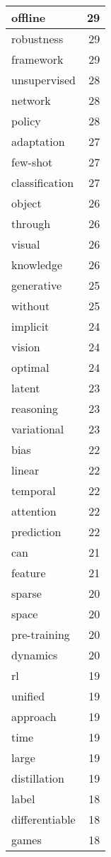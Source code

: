 \begin{table}[h]
\begin{tabular}{|l|r|}
\hline
offline & 29 \\
\hline
robustness & 29 \\
\hline
framework & 29 \\
\hline
unsupervised & 28 \\
\hline
network & 28 \\
\hline
policy & 28 \\
\hline
adaptation & 27 \\
\hline
few-shot & 27 \\
\hline
classification & 27 \\
\hline
object & 26 \\
\hline
through & 26 \\
\hline
visual & 26 \\
\hline
knowledge & 26 \\
\hline
generative & 25 \\
\hline
without & 25 \\
\hline
implicit & 24 \\
\hline
vision & 24 \\
\hline
optimal & 24 \\
\hline
latent & 23 \\
\hline
reasoning & 23 \\
\hline
variational & 23 \\
\hline
bias & 22 \\
\hline
linear & 22 \\
\hline
temporal & 22 \\
\hline
attention & 22 \\
\hline
prediction & 22 \\
\hline
can & 21 \\
\hline
feature & 21 \\
\hline
sparse & 20 \\
\hline
space & 20 \\
\hline
pre-training & 20 \\
\hline
dynamics & 20 \\
\hline
rl & 19 \\
\hline
unified & 19 \\
\hline
approach & 19 \\
\hline
time & 19 \\
\hline
large & 19 \\
\hline
distillation & 19 \\
\hline
label & 18 \\
\hline
differentiable & 18 \\
\hline
games & 18 \\

\end{tabular}
\end{table}
